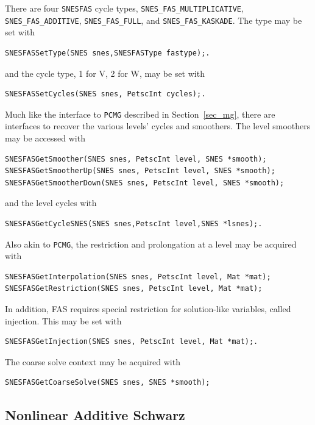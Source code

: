 There are four \lstinline{SNESFAS} cycle
types, \lstinline{SNES_FAS_MULTIPLICATIVE}, \lstinline{SNES_FAS_ADDITIVE}, \break\lstinline{SNES_FAS_FULL},
and \lstinline{SNES_FAS_KASKADE}. 
The type may be set with
\begin{lstlisting}
SNESFASSetType(SNES snes,SNESFASType fastype);.
\end{lstlisting}
\noindent and the cycle type, 1 for V, 2 for W, may be set with
\begin{lstlisting}
SNESFASSetCycles(SNES snes, PetscInt cycles);.
\end{lstlisting}
Much like the interface to \lstinline{PCMG} described in Section~\ref{sec_mg}, there are
interfaces to recover the various levels' cycles and smoothers. The level
smoothers may be accessed with
\begin{lstlisting}
SNESFASGetSmoother(SNES snes, PetscInt level, SNES *smooth);
SNESFASGetSmootherUp(SNES snes, PetscInt level, SNES *smooth);
SNESFASGetSmootherDown(SNES snes, PetscInt level, SNES *smooth);
\end{lstlisting}
\noindent and the level cycles with
\begin{lstlisting}
SNESFASGetCycleSNES(SNES snes,PetscInt level,SNES *lsnes);.
\end{lstlisting}
Also akin to \lstinline{PCMG}, the restriction and prolongation at a level may be acquired with
\begin{lstlisting}
SNESFASGetInterpolation(SNES snes, PetscInt level, Mat *mat);
SNESFASGetRestriction(SNES snes, PetscInt level, Mat *mat);
\end{lstlisting}
In addition, FAS requires special restriction for solution-like variables,
called injection.  This may be set with
\begin{lstlisting}
SNESFASGetInjection(SNES snes, PetscInt level, Mat *mat);.
\end{lstlisting}
The coarse solve context may be acquired with
\begin{lstlisting}
SNESFASGetCoarseSolve(SNES snes, SNES *smooth);
\end{lstlisting}

\subsection{Nonlinear Additive Schwarz}

